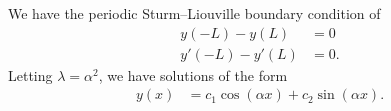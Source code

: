 \documentclass[10pt]{mypackage}
\begin{document}
\begin{solution}[11.4, Problem 4]
  We have the periodic Sturm--Liouville boundary condition of
  \begin{align*}
    y\left(-L\right) - y\left(L\right) &= 0\\
    y'\left(-L\right) - y'\left(L\right) &= 0.
  \end{align*}
  Letting $\lambda = \alpha^2$, we have solutions of the form
  \begin{align*}
    y(x) &= c_1\cos\left( \alpha x \right) + c_2\sin\left( \alpha x \right).
  \end{align*}
\end{solution}
\begin{solution}[11.4, Problem 8]

\end{solution}
\begin{solution}[11.4, Problem 10]

\end{solution}
\begin{solution}[12.3, Problem 2]

\end{solution}
\begin{solution}[12.3, Problem 4]

\end{solution}
\end{document}
